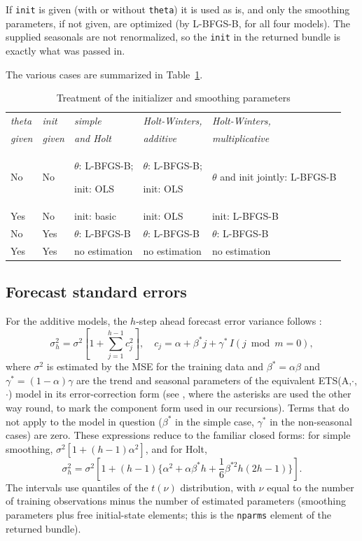 \documentclass{article}
\begin{document}
If \texttt{init} is given (with or without \texttt{theta}) it is used as
is, and only the smoothing parameters, if not given, are optimized (by
L-BFGS-B, for all four models). The supplied seasonals are not
renormalized, so the \texttt{init} in the returned bundle is exactly
what was passed in.

The various cases are summarized in Table~\ref{tab:cases}.
\begin{table}[htbp]
  \caption{Treatment of the initializer and smoothing parameters}
  \label{tab:cases}
  \vspace{1em}
  \centering
  \begin{tabular}{llp{1.1in}p{1.1in}p{1.1in}}
    \textit{theta} & \textit{init} & \textit{simple} &
       \textit{Holt-Winters,} & \textit{Holt-Winters,} \\[-4pt]
    \textit{given} & \textit{given} & \textit{and Holt} &
       \textit{additive} & \textit{multiplicative} \\[6pt]
    No & No & $\theta$: L-BFGS-B;\par init: OLS &
      $\theta$: L-BFGS-B;\par init: OLS & $\theta$ and init jointly: L-BFGS-B \\[6pt]
    Yes & No & init: basic & init: OLS &
      init: L-BFGS-B \\[6pt]
    No & Yes & $\theta$: L-BFGS-B & $\theta$: L-BFGS-B &
      $\theta$: L-BFGS-B \\[6pt]
    Yes & Yes & no estimation & no estimation & no estimation
  \end{tabular}
\end{table}

\subsection{Forecast standard errors}

For the additive models, the $h$-step ahead forecast error variance
follows \citet[section 8.7]{hyndman2021}:
\[
  \sigma^2_h = \sigma^2 \left[ 1 + \sum_{j=1}^{h-1} c_j^2 \right],
  \quad c_j = \alpha + \beta^{*} j + \gamma^{*}\, I(j \bmod m = 0),
\]
where $\sigma^2$ is estimated by the MSE for the training data and
$\beta^{*} = \alpha\beta$ and $\gamma^{*} = (1-\alpha)\gamma$ are the
trend and seasonal parameters of the equivalent ETS(A,$\cdot$,$\cdot$)
model in its error-correction form (see \citealt[sections 8.3 and
8.5]{hyndman2021}, where the asterisks are used the other way round,
to mark the component form used in our recursions). Terms that do not
apply to the model in question ($\beta^{*}$ in the simple case,
$\gamma^{*}$ in the non-seasonal cases) are zero. These expressions
reduce to the familiar closed forms: for simple smoothing,
$\sigma^2[1 + (h-1)\alpha^2]$, and for Holt,
\[
  \sigma^2_h = \sigma^2 \left[ 1 + (h-1) \{\alpha^2 + \alpha\beta^{*} h
        + \frac{1}{6} \beta^{*2}h(2h-1) \} \right].
\]
The intervals use quantiles of the $t(\nu)$ distribution, with $\nu$
equal to the number of training observations minus the number of
estimated parameters (smoothing parameters plus free initial-state
elements; this is the \texttt{nparms} element of the returned bundle).
\end{document}
